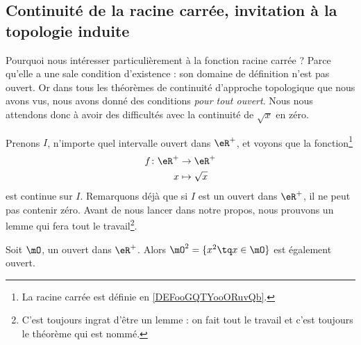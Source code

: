 \subsection{Continuité de la racine carrée, invitation à la topologie induite}

Pourquoi nous intéresser particulièrement à la fonction racine carrée ? Parce qu'elle a une sale condition d'existence : son domaine de définition n'est pas ouvert. Or dans tous les théorèmes de continuité d'approche topologique que nous avons vus, nous avons donné des conditions \emph{pour tout ouvert}. Nous nous attendons donc à avoir des difficultés avec la continuité de \( \sqrt{x}\) en zéro.

Prenons \( I\), n'importe quel intervalle ouvert dans \( \eR^+\), et voyons que la fonction\footnote{La racine carrée est définie en \ref{DEFooGQTYooORuvQb}.}
\begin{equation}
	\begin{aligned}
		f\colon \eR^+ & \to \eR^+        \\
		x             & \mapsto \sqrt{x}
	\end{aligned}
\end{equation}
est continue sur \( I\). Remarquons déjà que si \( I\) est un ouvert dans \( \eR^+\), il ne peut pas contenir zéro. Avant de nous lancer dans notre propos, nous prouvons un lemme qui fera tout le travail\footnote{C'est toujours ingrat d'être un lemme : on fait tout le travail et c'est toujours le théorème qui est nommé.}.

\begin{lemma}
	Soit \( \mO\), un ouvert dans \( \eR^+\). Alors \( \mO^2=\{ x^2\tq x\in\mO \}\) est également ouvert.
\end{lemma}

